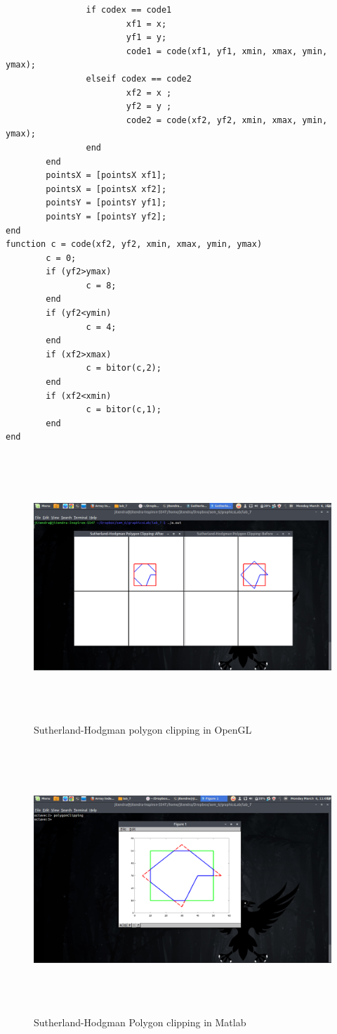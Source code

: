 \begin{itemize}
\begin{lstlisting}
                if codex == code1
                        xf1 = x;
                        yf1 = y;
                        code1 = code(xf1, yf1, xmin, xmax, ymin, ymax);
                elseif codex == code2
                        xf2 = x ;
                        yf2 = y ;
                        code2 = code(xf2, yf2, xmin, xmax, ymin, ymax);
                end
        end
        pointsX = [pointsX xf1];
        pointsX = [pointsX xf2];
        pointsY = [pointsY yf1];
        pointsY = [pointsY yf2];
end
function c = code(xf2, yf2, xmin, xmax, ymin, ymax)
        c = 0;
        if (yf2>ymax)
                c = 8;
        end
        if (yf2<ymin)
                c = 4;
        end
        if (xf2>xmax)
                c = bitor(c,2);
        end
        if (xf2<xmin)
                c = bitor(c,1);
        end
end

\end{lstlisting}
\end{itemize}
\begin{figure}[ht!]
\centering
\includegraphics[width=150mm, height=100mm]{polygonClippingOpenGL.png}
\caption{Sutherland-Hodgman polygon clipping in OpenGL \label{overflow}}
\end{figure}
\begin{figure}[ht!]
\centering
\includegraphics[width=150mm, height=100mm]{polygonClippingMatlab.png}
\caption{Sutherland-Hodgman Polygon clipping in Matlab \label{overflow}}
\end{figure}


